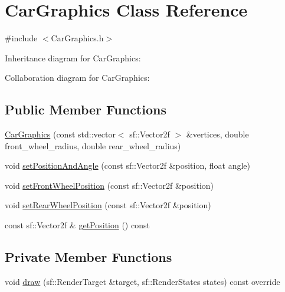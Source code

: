 \hypertarget{classCarGraphics}{}\section{Car\+Graphics Class Reference}
\label{classCarGraphics}


{\ttfamily \#include $<$Car\+Graphics.\+h$>$}



Inheritance diagram for Car\+Graphics\+:


Collaboration diagram for Car\+Graphics\+:
\subsection*{Public Member Functions}
\begin{DoxyCompactItemize}
\item 
\hyperlink{classCarGraphics_a37c8d0d08003f0a84495a3aedfe471db}{Car\+Graphics} (const std\+::vector$<$ sf\+::\+Vector2f $>$ \&vertices, double front\+\_\+wheel\+\_\+radius, double rear\+\_\+wheel\+\_\+radius)
\item 
void \hyperlink{classCarGraphics_a66e55f3ba283beb484eb8285c40bda14}{set\+Position\+And\+Angle} (const sf\+::\+Vector2f \&position, float angle)
\item 
void \hyperlink{classCarGraphics_a02169a6fec9b7d4c076b5597a11eac08}{set\+Front\+Wheel\+Position} (const sf\+::\+Vector2f \&position)
\item 
void \hyperlink{classCarGraphics_a30a28ce4d33808d22f6ca460c5b8013d}{set\+Rear\+Wheel\+Position} (const sf\+::\+Vector2f \&position)
\item 
const sf\+::\+Vector2f \& \hyperlink{classCarGraphics_a80e3b77608619843db5cbae4faee825b}{get\+Position} () const
\end{DoxyCompactItemize}
\subsection*{Private Member Functions}
\begin{DoxyCompactItemize}
\item 
void \hyperlink{classCarGraphics_a7a9cf695c9bae5a533c21c6f5d78e635}{draw} (sf\+::\+Render\+Target \&target, sf\+::\+Render\+States states) const override
\end{DoxyCompactItemize}
